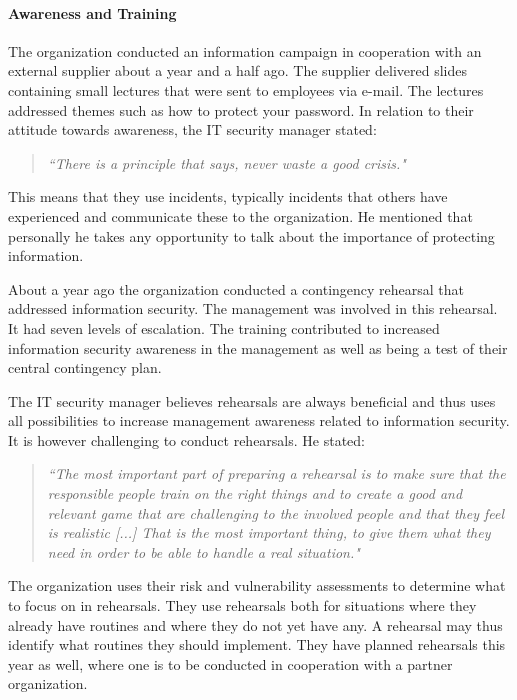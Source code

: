 \documentclass[b5paper, twoside, openright, 11pt]{report}
\begin{document}
\paragraph{Awareness and Training}
The organization conducted an information campaign in cooperation with an external supplier about a year and a half ago. The supplier delivered slides containing small lectures that were sent to employees via e-mail. The lectures addressed themes such as how to protect your password. In relation to their attitude towards awareness, the IT security manager stated: 

\begin{quote}
\textit{``There is a principle that says, never waste a good crisis."}
\end{quote}

This means that they use incidents, typically incidents that others have experienced and communicate these to the organization. He mentioned that personally he takes any opportunity to talk about the importance of protecting information.

About a year ago the organization conducted a contingency rehearsal that addressed information security. The management was involved in this rehearsal. It had seven levels of escalation. The training contributed to increased information security awareness in the management as well as being a test of their central contingency plan.

The IT security manager believes rehearsals are always beneficial and thus uses all possibilities to increase management awareness related to information security. It is however challenging to conduct rehearsals. He stated:

\begin{quote}
\textit{``The most important part of preparing a rehearsal is to make sure that the responsible people train on the right things and to create a good and relevant game that are challenging to the involved people and that they feel is realistic [...] That is the most important thing, to give them what they need in order to be able to handle a real situation."}
\end{quote}

The organization uses their risk and vulnerability assessments to determine what to focus on in rehearsals. They use rehearsals both for situations where they already have routines and where they do not yet have any. A rehearsal may thus identify what routines they should implement. They have planned rehearsals this year as well, where one is to be conducted in cooperation with a partner organization. 
\end{document}
